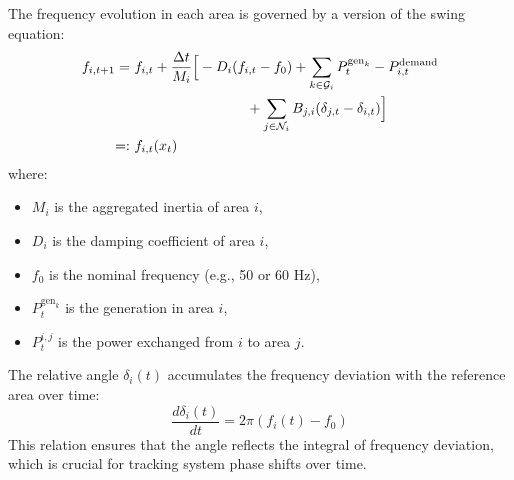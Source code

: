 \documentclass{article}
\begin{document}
The frequency evolution in each area is governed by a version of the swing equation:
\begin{align}
    f_{i,t+1} =\ & f_{i,t} + \frac{\Delta t}{M_i} \Big[ -D_i(f_{i,t} - f_0) 
    + \sum_{k \in \mathcal{G}_i} P^{\text{gen}_k}_t 
    - P^{\text{demand}}_{i,t} \notag \\
    &\qquad\qquad\qquad\qquad
    + \sum_{j \in \mathcal{N}_i} B_{j,i}(\delta_{j,t} - \delta_{i,t}) \Big] \\
    =:\ & f_{i,t}(x_t)
\end{align}
where:
\begin{itemize}
    \item $M_i$ is the aggregated inertia of area $i$,
    \item $D_i$ is the damping coefficient of area $i$,
    \item $f_0$ is the nominal frequency (e.g., 50 or 60 Hz),
    \item $P^{\text{gen}_k}_t$ is the generation in area $i$,
    \item $P^{i,j}_t$ is the power exchanged from $i$ to area $j$.
\end{itemize}

The relative angle $\delta_i(t)$ accumulates the frequency deviation with the reference area over time:
\begin{equation}
    \frac{d\delta_i(t)}{dt} = 2\pi(f_i(t) - f_0)
\end{equation}
This relation ensures that the angle reflects the integral of frequency deviation, which is crucial for tracking system phase shifts over time. 
\end{document}
